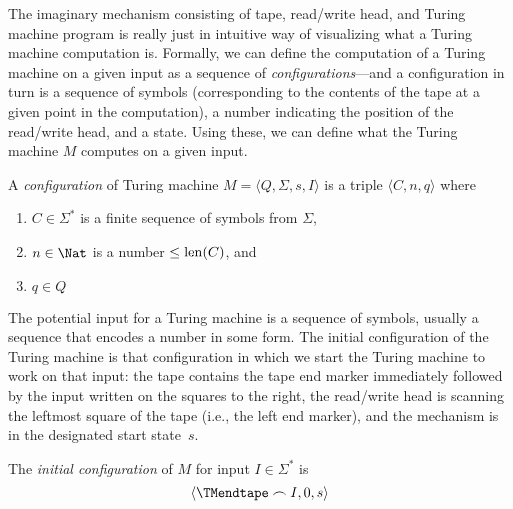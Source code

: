\documentclass[../../include/open-logic-section]{subfiles}
\begin{document}

\begin{explain}
The imaginary mechanism consisting of tape, read/write head, and
Turing machine program is really just in intuitive way of visualizing
what a Turing machine computation is.  Formally, we can define the
computation of a Turing machine on a given input as a sequence of
\emph{configurations}---and a configuration in turn is a sequence of
symbols (corresponding to the contents of the tape at a given point in
the computation), a number indicating the position of the read/write
head, and a state.  Using these, we can define what the Turing machine
$M$ computes on a given input.
\end{explain}

\begin{defn}
A \emph{configuration} of Turing machine $M = \langle Q, \Sigma, s,
I\rangle$ is a triple $\langle C, n, q\rangle$ where
\begin{enumerate}
\item $C \in \Sigma^*$ is a finite sequence of symbols from $\Sigma$,
\item $n \in \Nat$ is a number $\le \mathrm{len}(C)$, and
\item $q \in Q$ 
\end{enumerate}
\end{defn}

\begin{explain}
The potential input for a Turing machine is a sequence of symbols,
usually a sequence that encodes a number in some form.  The initial
configuration of the Turing machine is that configuration in which we
start the Turing machine to work on that input: the tape contains the
tape end marker immediately followed by the input written on the
squares to the right, the read/write head is scanning the leftmost
square of the tape (i.e., the left end marker), and the mechanism is
in the designated start state~$s$.
\end{explain}

\begin{defn}
The \emph{initial configuration} of $M$ for input $I \in \Sigma^*$ is
\[
\langle \TMendtape \frown I, 0, s\rangle
\]
\end{defn}
\end{document}
